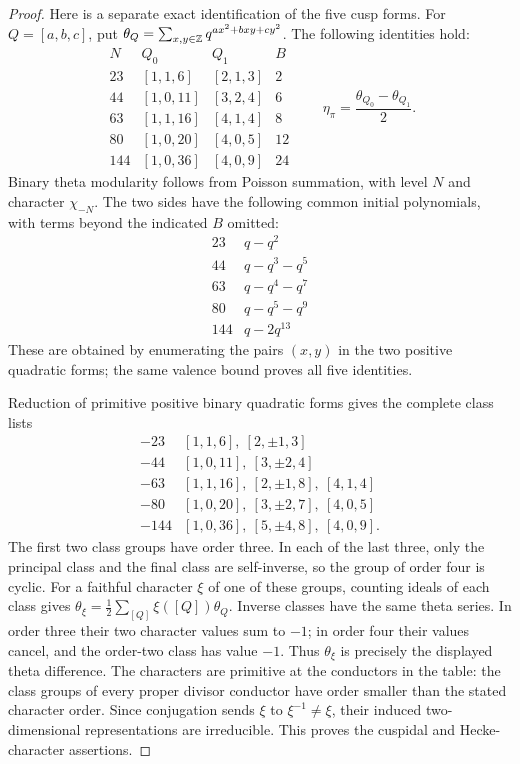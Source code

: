 \begin{proof}
Here is a separate exact identification of the five cusp forms.
For \(Q=[a,b,c]\), put
\(\theta_Q=\sum_{x,y\in\mathbb Z}q^{ax^2+bxy+cy^2}\).
The following identities hold:
\[
\begin{array}{c|cc|r}
 N&Q_0&Q_1&B\\\hline
23 &[1,1,6]&[2,1,3]&2\\
44 &[1,0,11]&[3,2,4]&6\\
63 &[1,1,16]&[4,1,4]&8\\
80 &[1,0,20]&[4,0,5]&12\\
144&[1,0,36]&[4,0,9]&24
\end{array}
\qquad
 \eta_\pi=\frac{\theta_{Q_0}-\theta_{Q_1}}2.
\]
Binary theta modularity follows from Poisson summation, with
level \(N\) and character \(\chi_{-N}\). The two sides have
the following common initial polynomials, with terms beyond
the indicated \(B\) omitted:
\[
\begin{array}{c|l}
23&q-q^2\\
44&q-q^3-q^5\\
63&q-q^4-q^7\\
80&q-q^5-q^9\\
144&q-2q^{13}
\end{array}
\]
These are obtained by enumerating the pairs \((x,y)\) in the
two positive quadratic forms; the same valence bound proves
all five identities.

Reduction of primitive positive binary quadratic forms gives
the complete class lists
\[
\begin{array}{c|l}
-23 &[1,1,6],\ [2,\pm1,3]\\
-44 &[1,0,11],\ [3,\pm2,4]\\
-63 &[1,1,16],\ [2,\pm1,8],\ [4,1,4]\\
-80 &[1,0,20],\ [3,\pm2,7],\ [4,0,5]\\
-144&[1,0,36],\ [5,\pm4,8],\ [4,0,9].
\end{array}
\]
The first two class groups have order three. In each of the
last three, only the principal class and the final class are
self-inverse, so the group of order four is cyclic.
For a faithful character \(\xi\) of one of these groups,
counting ideals of each class gives
\(\theta_\xi=\tfrac12\sum_{[Q]}\xi([Q])\theta_Q\).
Inverse classes have the same theta series. In order three their
two character values sum to \(-1\); in order four their values
cancel, and the order-two class has value \(-1\).
Thus \(\theta_\xi\) is precisely the displayed theta difference.
The characters are primitive at the conductors in the table:
the class groups of every proper divisor conductor have order
smaller than the stated character order. Since conjugation
sends \(\xi\) to \(\xi^{-1}\ne\xi\), their induced
two-dimensional representations are irreducible.
This proves the cuspidal and Hecke-character assertions.


\end{proof}
